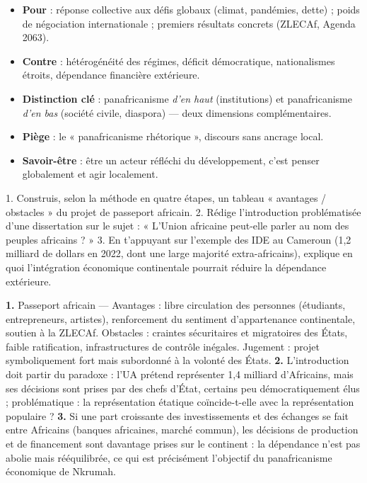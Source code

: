 \documentclass[11pt]{article}
\begin{document}
\begin{aretenir}
\begin{itemize}
\item \textbf{Pour} : réponse collective aux défis globaux (climat, pandémies, dette) ; poids de négociation internationale ; premiers résultats concrets (ZLECAf, Agenda 2063).
\item \textbf{Contre} : hétérogénéité des régimes, déficit démocratique, nationalismes étroits, dépendance financière extérieure.
\item \textbf{Distinction clé} : panafricanisme \emph{d'en haut} (institutions) et panafricanisme \emph{d'en bas} (société civile, diaspora) — deux dimensions complémentaires.
\item \textbf{Piège} : le « panafricanisme rhétorique », discours sans ancrage local.
\item \textbf{Savoir-être} : être un acteur réfléchi du développement, c'est penser globalement et agir localement.
\end{itemize}
\end{aretenir}

\begin{exercice}
1. Construis, selon la méthode en quatre étapes, un tableau « avantages / obstacles » du projet de passeport africain. 2. Rédige l'introduction problématisée d'une dissertation sur le sujet : « L'Union africaine peut-elle parler au nom des peuples africains ? » 3. En t'appuyant sur l'exemple des IDE au Cameroun (1,2 milliard de dollars en 2022, dont une large majorité extra-africains), explique en quoi l'intégration économique continentale pourrait réduire la dépendance extérieure.
\end{exercice}

\begin{corrige}[Exercice 5]
\textbf{1.} Passeport africain — Avantages : libre circulation des personnes (étudiants, entrepreneurs, artistes), renforcement du sentiment d'appartenance continentale, soutien à la ZLECAf. Obstacles : craintes sécuritaires et migratoires des États, faible ratification, infrastructures de contrôle inégales. Jugement : projet symboliquement fort mais subordonné à la volonté des États. \textbf{2.} L'introduction doit partir du paradoxe : l'UA prétend représenter 1,4 milliard d'Africains, mais ses décisions sont prises par des chefs d'État, certains peu démocratiquement élus ; problématique : la représentation étatique coïncide-t-elle avec la représentation populaire ? \textbf{3.} Si une part croissante des investissements et des échanges se fait entre Africains (banques africaines, marché commun), les décisions de production et de financement sont davantage prises sur le continent : la dépendance n'est pas abolie mais rééquilibrée, ce qui est précisément l'objectif du panafricanisme économique de Nkrumah.
\end{corrige}
\end{document}
